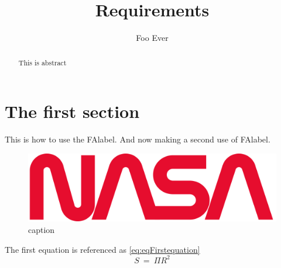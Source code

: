 \documentclass[a4paper,10pt]{article}
\title{Requirements}
\author{Foo Ever}
\begin{document}
\maketitle
\begin{abstract}
This is abstract
\end{abstract}
\printnomenclature
\printglossaries


\section{The first section}
This is how to use the \gls{FAlabel}. And now making a second use of \gls{FAlabel}.
\cite{uncleDT}

\begin{figure}[ht]
	\centering
	\includegraphics[width=0.75 \textwidth]{resources/project_or_company_logo.png}
	\caption{caption}
	\label{reference}
\end{figure}

The first equation is referenced as \ref{eq:eqFirstequation}
\begin{equation}
S~=~\Pi R^2
\label{eq:eqFirstequation}
\end{equation}

\printbibliography
\end{document}
